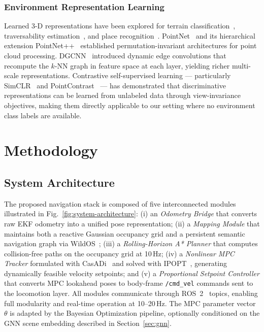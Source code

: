 \documentclass[conference]{IEEEtran}
\begin{document}
\subsubsection{Environment Representation Learning}
Learned 3-D representations have been explored for terrain classification~\cite{@TODO}, traversability estimation~\cite{@TODO}, and place recognition~\cite{@TODO}. PointNet~\cite{@TODO} and its hierarchical extension PointNet++~\cite{@TODO} established permutation-invariant architectures for point cloud processing. DGCNN~\cite{@TODO} introduced dynamic edge convolutions that recompute the $k$-NN graph in feature space at each layer, yielding richer multi-scale representations. Contrastive self-supervised learning — particularly SimCLR~\cite{@TODO} and PointContrast~\cite{@TODO} — has demonstrated that discriminative representations can be learned from unlabeled data through view-invariance objectives, making them directly applicable to our setting where no environment class labels are available.

\section{Methodology}
\label{sec:methodology}

\subsection{System Architecture}

The proposed navigation stack is composed of five interconnected modules illustrated in Fig.~\ref{fig:system-architecture}: (i) an \textit{Odometry Bridge} that converts raw EKF odometry into a unified pose representation; (ii) a \textit{Mapping Module} that maintains both a reactive Gaussian occupancy grid and a persistent semantic navigation graph via WildOS~\cite{shah2026wildosopenvocabularyobjectsearch}; (iii) a \textit{Rolling-Horizon A* Planner} that computes collision-free paths on the occupancy grid at 10\,Hz; (iv) a \textit{Nonlinear MPC Tracker} formulated with CasADi~\cite{@TODO} and solved with IPOPT~\cite{@TODO}, generating dynamically feasible velocity setpoints; and (v) a \textit{Proportional Setpoint Controller} that converts MPC lookahead poses to body-frame \texttt{/cmd\_vel} commands sent to the locomotion layer. All modules communicate through ROS~2~\cite{@TODO} topics, enabling full modularity and real-time operation at 10--20\,Hz. The MPC parameter vector $\theta$ is adapted by the Bayesian Optimization pipeline, optionally conditioned on the GNN scene embedding described in Section~\ref{sec:gnn}.
\end{document}
